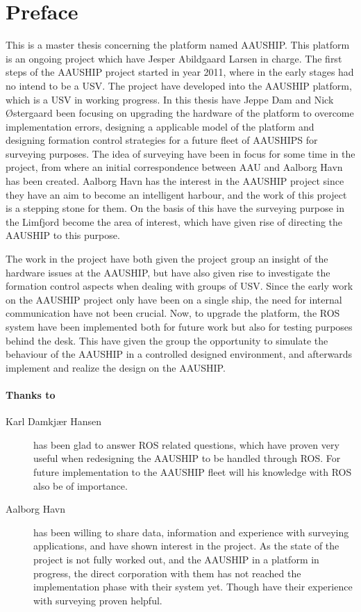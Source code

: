 \chapter{Preface}
This is a master thesis concerning the platform named AAUSHIP. This platform is an ongoing project which have Jesper Abildgaard Larsen in charge. The first steps of the AAUSHIP project started in year 2011, where in the early stages had no intend to be a USV. The project have developed into the AAUSHIP platform, which is a USV in working progress. In this thesis have Jeppe Dam and Nick Østergaard been focusing on upgrading the hardware of the platform to overcome implementation errors, designing a applicable model of the platform and designing formation control strategies for a future fleet of AAUSHIPS for surveying purposes. The idea of surveying have been in focus for some time in the project, from where an initial correspondence between AAU and Aalborg Havn has been created. Aalborg Havn has the interest in the AAUSHIP project since they have an aim to become an intelligent harbour, and the work of this project is a stepping stone for them. On the basis of this have the surveying purpose in the Limfjord become the area of interest, which have given rise of directing the AAUSHIP to this purpose.

The work in the project have both given the project group an insight of the hardware issues at the AAUSHIP, but have also given rise to investigate the formation control aspects when dealing with groups of USV. Since the early work on the AAUSHIP project only have been on a single ship, the need for internal communication have not been crucial. Now, to upgrade the platform, the ROS system have been implemented both for future work but also for testing purposes behind the desk. This have given the group the opportunity to simulate the behaviour of the AAUSHIP in a controlled designed environment, and afterwards implement and realize the design on the AAUSHIP.
\newpage

\subsubsection*{Thanks to}
\begin{description}
\item[Karl Damkjær Hansen] has been glad to answer ROS related questions, which have proven very useful when redesigning the AAUSHIP to be handled through ROS. For future implementation to the AAUSHIP fleet will his knowledge with ROS also be of importance.\\
\item[Aalborg Havn] has been willing to share data, information and experience with surveying applications, and have shown interest in the project. As the state of the project is not fully worked out, and the AAUSHIP in a platform in progress, the direct corporation with them has not reached the implementation phase with their system yet. Though have their experience with surveying proven helpful. 
\end{description}


